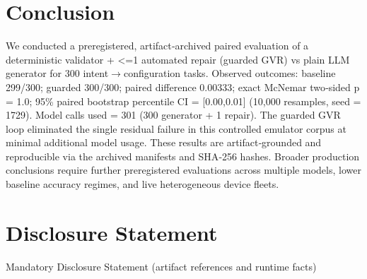 \documentclass[conference]{IEEEtran}
\begin{document}
\section{Conclusion}
We conducted a preregistered, artifact‑archived paired evaluation of a deterministic validator + <=1 automated repair (guarded GVR) vs plain LLM generator for 300 intent\ensuremath{\rightarrow}configuration tasks. Observed outcomes: baseline 299/300; guarded 300/300; paired difference 0.00333; exact McNemar two‑sided p = 1.0; 95\% paired bootstrap percentile CI = [0.00,0.01] (10,000 resamples, seed = 1729). Model calls used = 301 (300 generator + 1 repair). The guarded GVR loop eliminated the single residual failure in this controlled emulator corpus at minimal additional model usage. These results are artifact‑grounded and reproducible via the archived manifests and SHA‑256 hashes. Broader production conclusions require further preregistered evaluations across multiple models, lower baseline accuracy regimes, and live heterogeneous device fleets.

\section*{Disclosure Statement}
Mandatory Disclosure Statement (artifact references and runtime facts)
\end{document}
